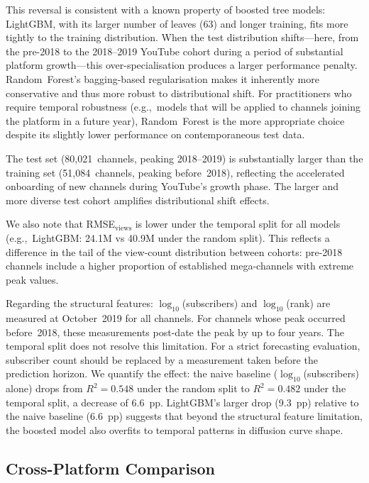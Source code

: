 \documentclass[journal,article,submit,pdftex,moreauthors]{Definitions/mdpi}
\begin{document}
This reversal is consistent with a known property of boosted tree models:
LightGBM, with its larger number of leaves (63) and longer training,
fits more tightly to the training distribution.
When the test distribution shifts---here, from the pre-2018 to the
2018--2019 YouTube cohort during a period of substantial platform
growth---this over-specialisation produces a larger performance penalty.
Random~Forest's bagging-based regularisation makes it inherently more
conservative and thus more robust to distributional shift.
For practitioners who require temporal robustness (e.g.,\ models that
will be applied to channels joining the platform in a future year),
Random~Forest is the more appropriate choice despite its slightly lower
performance on contemporaneous test data.

The test set (80,021~channels, peaking 2018--2019) is substantially
larger than the training set (51,084~channels, peaking before~2018),
reflecting the accelerated onboarding of new channels during YouTube's
growth phase.
The larger and more diverse test cohort amplifies distributional shift
effects.

We also note that RMSE$_\text{views}$ is lower under the temporal split
for all models (e.g.,\ LightGBM: 24.1M vs 40.9M under the random split).
This reflects a difference in the tail of the view-count distribution
between cohorts: pre-2018 channels include a higher proportion of
established mega-channels with extreme peak values.

Regarding the structural features: $\log_{10}$(subscribers) and
$\log_{10}$(rank) are measured at October~2019 for all channels.
For channels whose peak occurred before~2018, these measurements post-date
the peak by up to four years.
The temporal split does not resolve this limitation.
For a strict forecasting evaluation, subscriber count should be replaced
by a measurement taken before the prediction horizon.
We quantify the effect: the naive baseline ($\log_{10}$(subscribers)
alone) drops from $R^2 = 0.548$ under the random split to $R^2 = 0.482$
under the temporal split, a decrease of 6.6~pp.
LightGBM's larger drop (9.3~pp) relative to the naive baseline (6.6~pp)
suggests that beyond the structural feature limitation, the boosted model
also overfits to temporal patterns in diffusion curve shape.

\subsection{Cross-Platform Comparison}
\label{sec:crossplatform}
\end{document}
